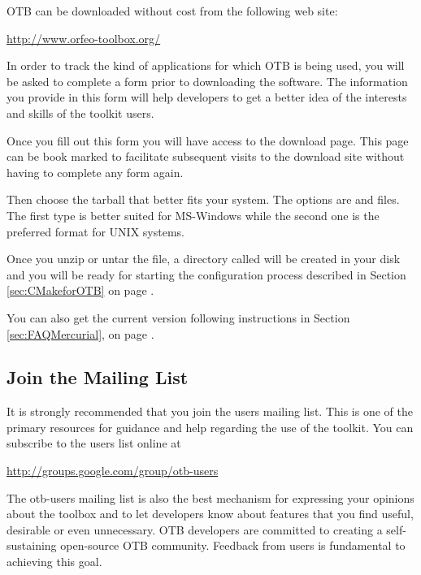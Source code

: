 
OTB can be downloaded without cost from the following web site:
\begin{center}
  \url{http://www.orfeo-toolbox.org/}
\end{center}
In order to track the kind of applications for which OTB is being used, you
will be asked to complete a form prior to downloading the software.
The information you provide in this form will help developers to get a better
idea of the interests and skills of the toolkit users.

Once you fill out this form you will have access to the download
page. This page can be book marked to facilitate subsequent visits to
the download site without having to complete any form again.

 Then choose the tarball that better fits your system. The options
are  and  files.  The first type is better suited for
MS-Windows while the second one is the preferred format for UNIX systems.

Once you unzip or untar the file, a directory called  will be
created in your disk and you will be ready for starting the configuration
process described in Section \ref{sec:CMakeforOTB} on page
\pageref{sec:CMakeforOTB}.

You can also get the current version following instructions in Section
\ref{sec:FAQMercurial}, on page \pageref{sec:FAQMercurial}.

\subsection{Join the Mailing List}
\label{sec:JoinMailList}


It is strongly recommended that you join the users mailing list. This is one
of the primary resources for guidance and help regarding the use of the
toolkit. You can subscribe to the users list online at

\begin{center}
\url{http://groups.google.com/group/otb-users}
\end{center}

The otb-users mailing list is also the best mechanism for expressing your
opinions about the toolbox and to let developers know about features that you
find useful, desirable or even unnecessary. OTB developers are committed to
creating a self-sustaining open-source OTB community. Feedback from users is
fundamental to achieving this goal.

